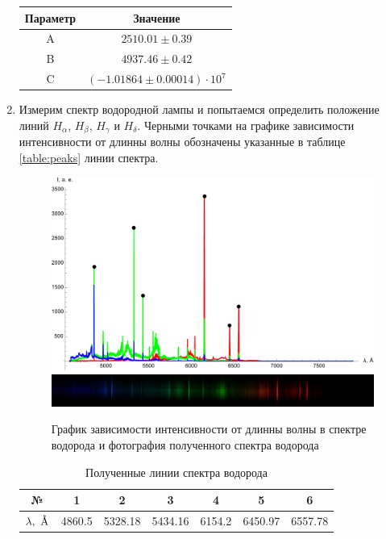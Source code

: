 \documentclass[a4paper, 12pt]{article}
\newcommand{\angstrom}{\textup{\AA}}
\begin{document}
\begin{enumerate}
\begin{table}[!h]
\begin{tabular}{|c|c|}
				Параметр & Значение\\
				\hline
				A & $2510.01 \pm 0.39$\\
				B & $4937.46 \pm 0.42$\\
				C & $(-1.01864 \pm 0.00014)\cdot10^7$\\
				\hline
			\end{tabular}
			\label{table:calapprox}
		\end{table}
		\item Измерим спектр водородной лампы и попытаемся определить положение линий $H_{\alpha}$, $H_{\beta}$, $H_{\gamma}$ и $H_{\delta}$. Черными точками на графике зависимости интенсивности от длинны волны обозначены указанные в таблице \ref{table:peaks} линии спектра.\par
		\begin{figure}[!htb]
		    \includegraphics[width=\linewidth]{h2_plot_peaks.pdf}
		    \endminipage\\
		    \includegraphics[width=\linewidth]{h2_spectre.JPG}
		    \endminipage
		    \caption{График зависимости интенсивности от длинны волны в спектре водорода и фотография полученного спектра водорода}
		\end{figure}
		\begin{table}[!htb]
		    \centering
		    \caption{Полученные линии спектра водорода}
		    \begin{tabular}{|c|c|c|c|c|c|c|}
		        \hline
		        № & 1 & 2 & 3 & 4 & 5 & 6\\
		        \hline
		        $\lambda,\ \angstrom$ & 4860.5 & 5328.18 & 5434.16 & 6154.2 & 6450.97 & 6557.78 \\

\end{tabular}
\end{table}
\end{enumerate}
\end{document}
